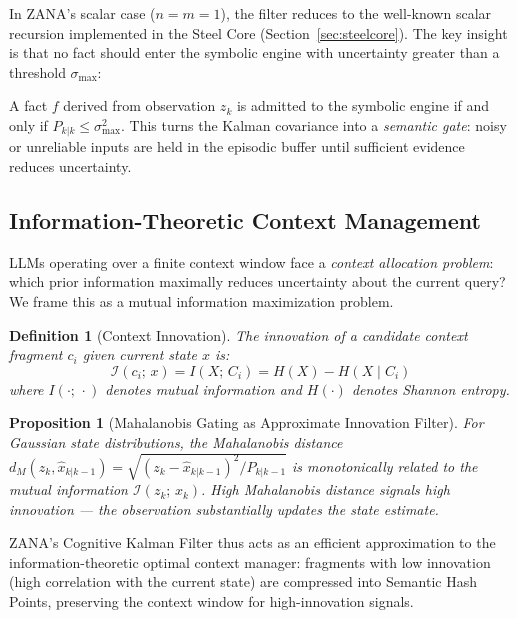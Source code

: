 \documentclass[12pt,a4paper]{article}
\newtheorem{definition}{Definition}[section]
\newtheorem{proposition}{Proposition}[section]
\begin{document}
In ZANA's scalar case ($n = m = 1$), the filter reduces to the well-known scalar recursion
implemented in the Steel Core (Section~\ref{sec:steelcore}). The key insight is that no fact
should enter the symbolic engine with uncertainty greater than a threshold $\sigma_{\max}$:

\begin{tcolorbox}[insight]
A fact $f$ derived from observation $z_k$ is admitted to the symbolic engine if and only if
$P_{k|k} \leq \sigma_{\max}^2$. This turns the Kalman covariance into a \emph{semantic gate}:
noisy or unreliable inputs are held in the episodic buffer until sufficient evidence
reduces uncertainty.
\end{tcolorbox}

\subsection{Information-Theoretic Context Management}

LLMs operating over a finite context window face a \emph{context allocation problem}: which
prior information maximally reduces uncertainty about the current query? We frame this as a
mutual information maximization problem.

\begin{definition}[Context Innovation]
The \emph{innovation} of a candidate context fragment $c_i$ given current state $x$ is:
\begin{equation}
  \mathcal{I}(c_i;\, x) = I(X;\, C_i) = H(X) - H(X \mid C_i)
  \label{eq:innovation}
\end{equation}
where $I(\cdot;\,\cdot)$ denotes mutual information and $H(\cdot)$ denotes Shannon entropy.
\end{definition}

\begin{proposition}[Mahalanobis Gating as Approximate Innovation Filter]
For Gaussian state distributions, the Mahalanobis distance $d_M(z_k, \hat{x}_{k|k-1}) =
\sqrt{(z_k - \hat{x}_{k|k-1})^2 / P_{k|k-1}}$ is monotonically related to the mutual
information $\mathcal{I}(z_k;\,x_k)$. High Mahalanobis distance signals high innovation
--- the observation substantially updates the state estimate.
\end{proposition}

\noindent ZANA's Cognitive Kalman Filter thus acts as an efficient approximation to the
information-theoretic optimal context manager: fragments with low innovation (high correlation
with the current state) are compressed into Semantic Hash Points, preserving the context window
for high-innovation signals.
\end{document}
